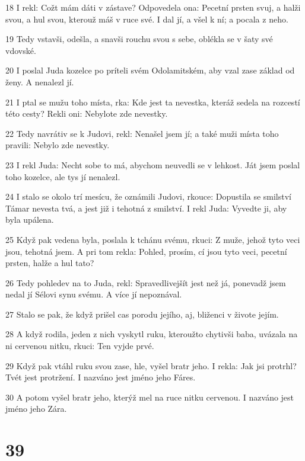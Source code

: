 \par 18 I rekl: Cožt mám dáti v zástave? Odpovedela ona: Pecetní prsten svuj, a halži svou, a hul svou, kterouž máš v ruce své. I dal jí, a všel k ní; a pocala z neho.
\par 19 Tedy vstavši, odešla, a snavši rouchu svou s sebe, oblékla se v šaty své vdovské.
\par 20 I poslal Juda kozelce po príteli svém Odolamitském, aby vzal zase základ od ženy. A nenalezl jí.
\par 21 I ptal se mužu toho místa, rka: Kde jest ta nevestka, kteráž sedela na rozcestí této cesty? Rekli oni: Nebylote zde nevestky.
\par 22 Tedy navrátiv se k Judovi, rekl: Nenašel jsem jí; a také muži místa toho pravili: Nebylo zde nevestky.
\par 23 I rekl Juda: Necht sobe to má, abychom neuvedli se v lehkost. Ját jsem poslal toho kozelce, ale tys jí nenalezl.
\par 24 I stalo se okolo trí mesícu, že oznámili Judovi, rkouce: Dopustila se smilství Támar nevesta tvá, a jest již i tehotná z smilství. I rekl Juda: Vyvedte ji, aby byla upálena.
\par 25 Když pak vedena byla, poslala k tchánu svému, rkuci: Z muže, jehož tyto veci jsou, tehotná jsem. A pri tom rekla: Pohled, prosím, cí jsou tyto veci, pecetní prsten, halže a hul tato?
\par 26 Tedy pohledev na to Juda, rekl: Spravedlivejšít jest než já, ponevadž jsem nedal jí Sélovi synu svému. A více jí nepoznával.
\par 27 Stalo se pak, že když prišel cas porodu jejího, aj, bliženci v živote jejím.
\par 28 A když rodila, jeden z nich vyskytl ruku, kteroužto chytivši baba, uvázala na ni cervenou nitku, rkuci: Ten vyjde prvé.
\par 29 Když pak vtáhl ruku svou zase, hle, vyšel bratr jeho. I rekla: Jak jsi protrhl? Tvét jest protržení. I nazváno jest jméno jeho Fáres.
\par 30 A potom vyšel bratr jeho, kterýž mel na ruce nitku cervenou. I nazváno jest jméno jeho Zára.

\chapter{39}

